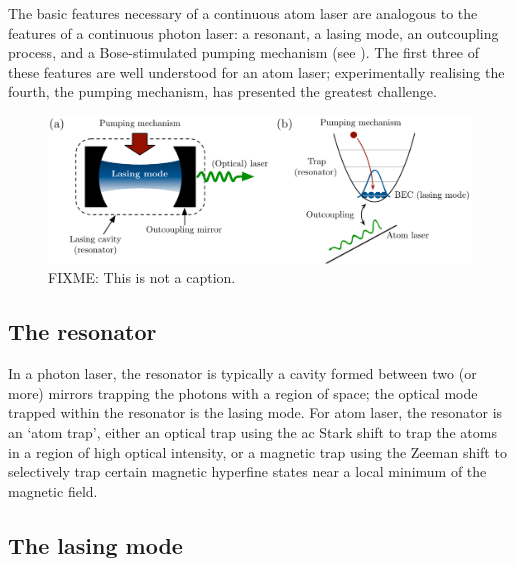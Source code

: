 The basic features necessary of a continuous atom laser are analogous to the features of a continuous photon laser: a resonant, a lasing mode, an outcoupling process, and a Bose-stimulated pumping mechanism (see ).  The first three of these features are well understood for an atom laser; experimentally realising the fourth, the pumping mechanism, has presented the greatest challenge.

\begin{figure}
    \centering
    \includegraphics[width=14cm]{LaserAtomLaserComparison}
    \caption{
        \label{Introduction:LaserAtomLaserComparison}
        FIXME: This is not a caption.
    }
\end{figure}

\subsection{The resonator}

In a photon laser, the resonator is typically a cavity formed between two (or more) mirrors trapping the photons with a region of space; the optical mode trapped within the resonator is the lasing mode.  For atom laser, the resonator is an `atom trap', either an optical trap using the ac Stark shift to trap the atoms in a region of high optical intensity, or a magnetic trap using the Zeeman shift to selectively trap certain magnetic hyperfine states near a local minimum of the magnetic field.

\subsection{The lasing mode}

